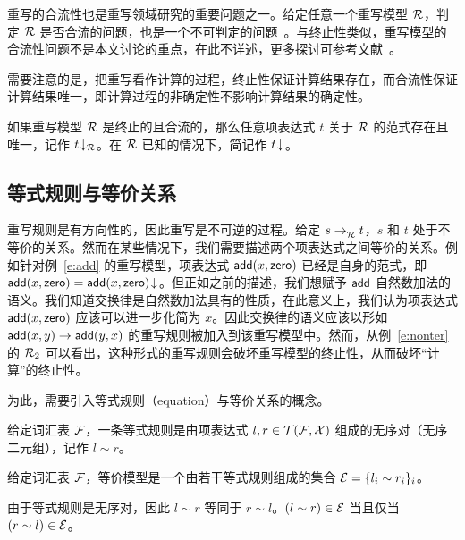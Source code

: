 重写的合流性也是重写领域研究的重要问题之一。给定任意一个重写模型 $\mathcal{R}$，判定 $\mathcal{R}$ 是否合流的问题，也是一个不可判定的问题~\cite{DBLP:journals/ipl/Jacquemard03}。与终止性类似，重写模型的合流性问题不是本文讨论的重点，在此不详述，更多探讨可参考文献~。

需要注意的是，把重写看作计算的过程，终止性保证计算结果存在，而合流性保证计算结果唯一，即计算过程的非确定性不影响计算结果的确定性。

\begin{lemma}
如果重写模型 $\mathcal{R}$ 是终止的且合流的，那么任意项表达式 $t$ 关于 $\mathcal{R}$ 的范式存在且唯一，记作 ${t}\!\downarrow_{\mathcal{R}}$。在 $\mathcal{R}$ 已知的情况下，简记作 ${t}\!\downarrow_{}$。
\end{lemma}



\subsection{等式规则与等价关系}

重写规则是有方向性的，因此重写是不可逆的过程。给定 $s\mathrel{\rightarrow^{}_{\mathcal{R}}}t$，$s$ 和 $t$ 处于不等价的关系。然而在某些情况下，我们需要描述两个项表达式之间等价的关系。例如针对例~\ref{e:add} 的重写模型，项表达式 $\operatorname{\mathsf{add}}(x,\operatorname{\mathsf{zero}})$ 已经是自身的范式，即 $\operatorname{\mathsf{add}}(x,\operatorname{\mathsf{zero}}) = {\operatorname{\mathsf{add}}(x,\operatorname{\mathsf{zero}})}\!\downarrow_{}$。但正如之前的描述，我们想赋予 $\operatorname{\mathsf{add}}$ 自然数加法的语义。我们知道交换律是自然数加法具有的性质，在此意义上，我们认为项表达式 $\operatorname{\mathsf{add}}(x,\operatorname{\mathsf{zero}})$ 应该可以进一步化简为 $x$。因此交换律的语义应该以形如 $\operatorname{\mathsf{add}}(x,y)\rightarrow\operatorname{\mathsf{add}}(y,x)$ 的重写规则被加入到该重写模型中。然而，从例~\ref{e:nonter} 的 $\mathcal{R}_2$ 可以看出，这种形式的重写规则会破坏重写模型的终止性，从而破坏“计算”的终止性。

为此，需要引入等式规则（equation）与等价关系的概念。

\begin{definition}[等式规则]
\label{d:eq}
给定词汇表 $\mathcal{F}$，一条等式规则是由项表达式 $l,r\in\mathcal{T}(\mathcal{F},\mathcal{X})$ 组成的无序对（无序二元组），记作 $l\sim r$。
\end{definition}

\begin{definition}
\label{d:eq-sys}
给定词汇表 $\mathcal{F}$，等价模型是一个由若干等式规则组成的集合 $\mathcal{E} = \{l_i \sim r_i\}_i$。
\end{definition}

由于等式规则是无序对，因此 $l\sim r$ 等同于 $r\sim l$。$(l\sim r)\in\mathcal{E}$ 当且仅当 $(r\sim l)\in\mathcal{E}$。

